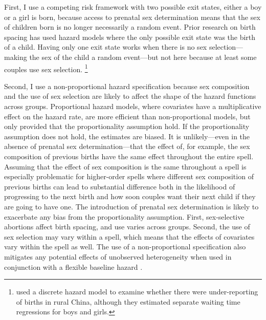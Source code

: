 \documentclass[12pt,letterpaper]{article}
\begin{document}
First, I use a competing risk framework with two possible exit states, either a boy
or a girl is born, because access to prenatal sex determination means that
the sex of children born is no longer necessarily a random event.
Prior research on birth spacing has used hazard models where the only 
possible exit state was the birth of a child. 
Having only one exit state works when there is no sex selection---making the 
sex of the child a random event---but not here because at least some couples use 
sex selection.%
\footnote{
\cite{Merli2000} used a discrete hazard model to examine whether 
there were under-reporting of births in rural China, although they 
estimated separate waiting time regressions for boys and girls.
}

Second, I use a non-proportional hazard specification because
sex composition and the use of sex selection are likely to affect 
the shape of the hazard functions across groups.
Proportional hazard models, where covariates have a multiplicative 
effect on the hazard rate, are more efficient than non-proportional 
models, but only provided that the proportionality assumption hold.
If the proportionality assumption does not hold, the estimates
are biased.
It is unlikely---even in the absence of prenatal sex determination---that 
the effect of, for example, the sex composition of previous births have 
the same effect throughout the entire spell.
Assuming that the effect of sex composition is the same throughout a spell
is especially problematic for higher-order spells where different
sex composition of previous births can lead to substantial difference 
both in the likelihood of progressing to the next birth and
how soon couples want their next child if they are going to have one.
The introduction of prenatal sex determination is likely to exacerbate 
any bias from the proportionality assumption.
First, sex-selective abortions affect birth spacing, and use
varies across groups.
Second, the use of sex selection may vary within a spell, which means 
that the effects of covariates vary within the spell as well.
The use of a non-proportional specification also mitigates any potential 
effects of unobserved heterogeneity when used in conjunction with a 
flexible baseline hazard \citep{Dolton1995}.
\end{document}
